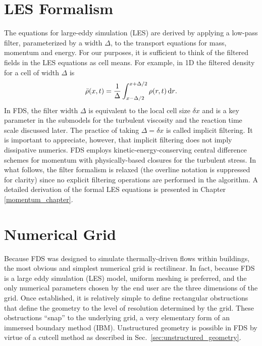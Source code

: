 \section{LES Formalism}
\label{filteredfields}

The equations for large-eddy simulation (LES) are derived by applying a low-pass filter, parameterized by a width $\Delta$, to the transport equations for mass, momentum and energy.  For our purposes, it is sufficient to think of the filtered fields in the LES equations as cell means.  For example, in 1D the filtered density for a cell of width $\Delta$ is
\begin{equation}
\label{eqn_filtered_density}
\bar{\rho}(x,t) = \frac{1}{\Delta}\int_{x-\Delta/2}^{x+\Delta/2} \rho(r,t) \,\mathrm{d} r \mbox{.}
\end{equation}
In FDS, the filter width $\Delta$ is equivalent to the local cell size $\delta x$ and is a key parameter in the submodels for the turbulent viscosity and the reaction time scale discussed later.  The practice of taking $\Delta = \delta x$ is called implicit filtering.  It is important to appreciate, however, that implicit filtering does not imply dissipative numerics.  FDS employs kinetic-energy-conserving central difference schemes for momentum with physically-based closures for the turbulent stress.  In what follows, the filter formalism is relaxed (the overline notation is suppressed for clarity) since no explicit filtering operations are performed in the algorithm.  A detailed derivation of the formal LES equations is presented in Chapter \ref{momentum_chapter}.

\section{Numerical Grid}
\label{govequations}

Because FDS was designed to simulate thermally-driven flows within buildings, the most obvious and simplest numerical grid is rectilinear. In fact, because FDS is a large eddy simulation (LES) model, uniform meshing is preferred, and the only numerical parameters chosen by the end user are the three dimensions of the grid. Once established, it is relatively simple to define rectangular obstructions that define the geometry to the level of resolution determined by the grid. These obstructions ``snap'' to the underlying grid, a very elementary form of an immersed boundary method (IBM). Unstructured geometry is possible in FDS by virtue of a cutcell method as described in Sec.~\ref{sec:unstructured_geometry}.

